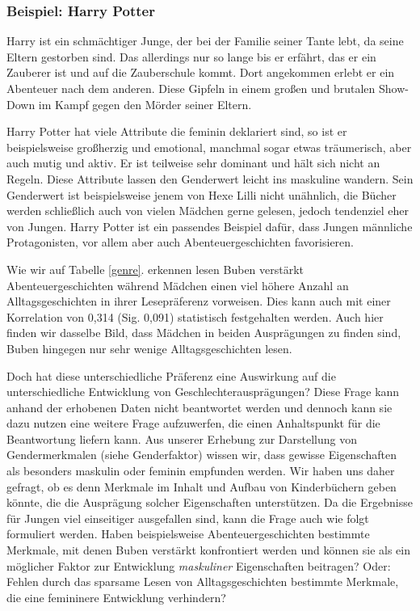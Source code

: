 \subsubsection{Beispiel: Harry Potter}

Harry ist ein schmächtiger Junge, der bei der Familie seiner Tante lebt,
da seine Eltern gestorben sind. Das allerdings nur so lange bis er
erfährt, das er ein Zauberer ist und auf die Zauberschule kommt. Dort
angekommen erlebt er ein Abenteuer nach dem anderen. Diese Gipfeln in
einem großen und brutalen Show-Down im Kampf gegen den Mörder seiner
Eltern. \parencite{Rowling1998}

Harry Potter hat viele Attribute die feminin deklariert sind, so ist er
beispielsweise großherzig und emotional, manchmal sogar etwas
träumerisch, aber auch mutig und aktiv. Er ist teilweise sehr dominant
und hält sich nicht an Regeln. Diese Attribute lassen den Genderwert
leicht ins maskuline wandern. Sein Genderwert ist beispielsweise jenem
von Hexe Lilli nicht unähnlich, die Bücher werden schließlich auch von
vielen Mädchen gerne gelesen, jedoch tendenziel eher von Jungen. Harry
Potter ist ein passendes Beispiel dafür, dass Jungen männliche
Protagonisten, vor allem aber auch Abenteuergeschichten favorisieren.

Wie wir auf Tabelle \ref{genre}. erkennen lesen Buben verstärkt
Abenteuergeschichten während Mädchen einen viel höhere Anzahl an
Alltagsgeschichten in ihrer Lesepräferenz vorweisen. Dies kann auch mit
einer Korrelation von 0,314 (Sig. 0,091) statistisch festgehalten
werden. Auch hier finden wir dasselbe Bild, dass Mädchen in beiden
Ausprägungen zu finden sind, Buben hingegen nur sehr wenige
Alltagsgeschichten lesen.

Doch hat diese unterschiedliche Präferenz eine Auswirkung auf die
unterschiedliche Entwicklung von Geschlechterausprägungen? Diese Frage
kann anhand der erhobenen Daten nicht beantwortet werden und dennoch
kann sie dazu nutzen eine weitere Frage aufzuwerfen, die einen
Anhaltspunkt für die Beantwortung liefern kann. Aus unserer Erhebung zur
Darstellung von Gendermerkmalen (siehe Genderfaktor) wissen wir, dass
gewisse Eigenschaften als besonders maskulin oder feminin empfunden
werden. Wir haben uns daher gefragt, ob es denn Merkmale im Inhalt und
Aufbau von Kinderbüchern geben könnte, die die Ausprägung solcher
Eigenschaften unterstützen. Da die Ergebnisse für Jungen viel
einseitiger ausgefallen sind, kann die Frage auch wie folgt formuliert
werden. Haben beispielsweise Abenteuergeschichten bestimmte Merkmale,
mit denen Buben verstärkt konfrontiert werden und können sie als ein
möglicher Faktor zur Entwicklung \emph{maskuliner} Eigenschaften
beitragen? Oder: Fehlen durch das sparsame Lesen von Alltagsgeschichten
bestimmte Merkmale, die eine femininere Entwicklung verhindern?

